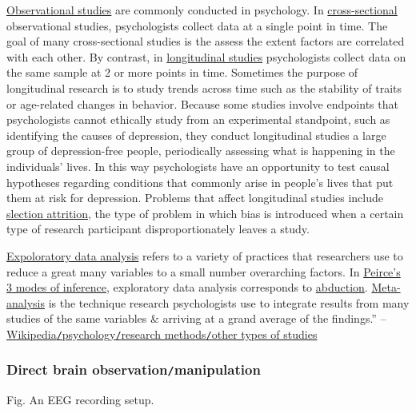 \documentclass[oneside]{book}
\numberwithin{equation}{section}
\begin{document}
\href{https://en.wikipedia.org/wiki/Observational_studies}{Observational studies} are commonly conducted in psychology. In \href{https://en.wikipedia.org/wiki/Cross-sectional_studies}{cross-sectional} observational studies, psychologists collect data at a single point in time. The goal of many cross-sectional studies is the assess the extent factors are correlated with each other. By contrast, in \href{https://en.wikipedia.org/wiki/Longitudinal_studies}{longitudinal studies} psychologists collect data on the same sample at 2 or more points in time. Sometimes the purpose of longitudinal research is to study trends across time such as the stability of traits or age-related changes in behavior. Because some studies involve endpoints that psychologists cannot ethically study from an experimental standpoint, such as identifying the causes of depression, they conduct longitudinal studies a large group of depression-free people, periodically assessing what is happening in the individuals' lives. In this way psychologists have an opportunity to test causal hypotheses regarding conditions that commonly arise in people's lives that put them at risk for depression. Problems that affect longitudinal studies include \href{https://en.wikipedia.org/wiki/Selection_bias#Attrition}{slection attrition}, the type of problem in which bias is introduced when a certain type of research participant disproportionately leaves a study.

\href{https://en.wikipedia.org/wiki/Exploratory_data_analysis}{Expoloratory data analysis} refers to a variety of practices that researchers use to reduce a great many variables to a small number overarching factors. In \href{https://en.wikipedia.org/wiki/Charles_Sanders_Peirce#Modes_of_inference}{Peirce's 3 modes of inference}, exploratory data analysis corresponds to \href{https://en.wikipedia.org/wiki/Abduction_(logic)}{abduction}. \href{https://en.wikipedia.org/wiki/Meta-analysis}{Meta-analysis} is the technique research psychologists use to integrate results from many studies of the same variables \& arriving at a grand average of the findings.'' -- \href{https://en.wikipedia.org/wiki/Psychology#Other_types_of_studies}{Wikipedia\texttt{/}psychology\texttt{/}research methods\texttt{/}other types of studies}

\subsubsection{Direct brain observation\texttt{/}manipulation}
\textsf{Fig. An EEG recording setup.}
\end{document}

